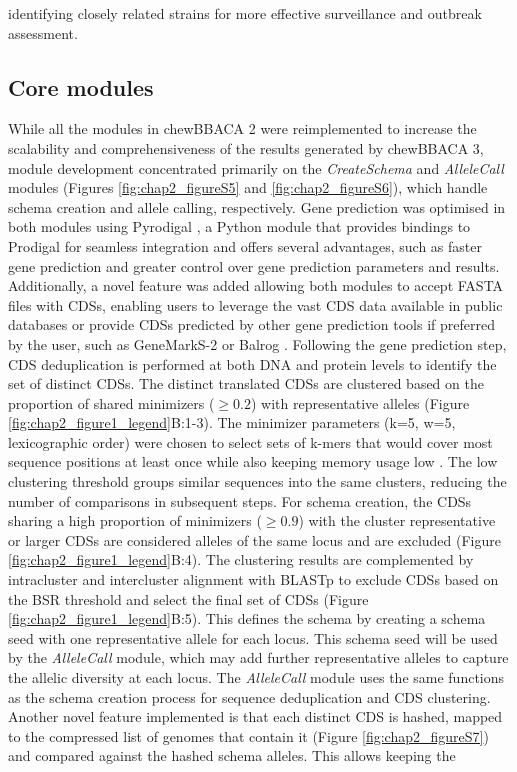 identifying closely related strains for more effective surveillance and outbreak assessment.

\subsection{Core modules} \label{ssec:ch2_implementation_core_modules}

While all the modules in chewBBACA 2 were reimplemented to increase the scalability and comprehensiveness of the results generated by chewBBACA 3, module development concentrated primarily on the \textit{CreateSchema} and \textit{AlleleCall} modules (Figures \ref{fig:chap2_figureS5} and \ref{fig:chap2_figureS6}), which handle schema creation and allele calling, respectively. Gene prediction was optimised in both modules using Pyrodigal \citep{larralde_pyrodigal_2022, hyatt_prodigal_2010}, a Python module that provides bindings to Prodigal for seamless integration and offers several advantages, such as faster gene prediction and greater control over gene prediction parameters and results. Additionally, a novel feature was added allowing both modules to accept FASTA files with \ac{CDSs}, enabling users to leverage the vast \ac{CDS} data available in public databases or provide \ac{CDSs} predicted by other gene prediction tools if preferred by the user, such as GeneMarkS-2 or Balrog \citep{lomsadze_modeling_2018, sommer_balrog_2021}. Following the gene prediction step, \ac{CDS} deduplication is performed at both \ac{DNA} and protein levels to identify the set of distinct \ac{CDSs}. The distinct translated \ac{CDSs} are clustered based on the proportion of shared minimizers ($\geq0.2$) with representative alleles \citep{schleimer_winnowing_nodate, roberts_reducing_2004, marcais_improving_2017} (Figure \ref{fig:chap2_figure1_legend}B:1-3). The minimizer parameters (k=5, w=5, lexicographic order) were chosen to select sets of k-mers that would cover most sequence positions at least once while also keeping memory usage low \citep{zheng_improved_2020}. The low clustering threshold groups similar sequences into the same clusters, reducing the number of comparisons in subsequent steps. For schema creation, the \ac{CDSs} sharing a high proportion of minimizers ($\geq0.9$) with the cluster representative or larger \ac{CDSs} are considered alleles of the same locus and are excluded (Figure \ref{fig:chap2_figure1_legend}B:4). The clustering results are complemented by intracluster and intercluster alignment with \ac{BLASTp} to exclude \ac{CDSs} based on the \ac{BSR} threshold and select the final set of \ac{CDSs} (Figure \ref{fig:chap2_figure1_legend}B:5). This defines the schema by creating a schema seed with one representative allele for each locus. This schema seed will be used by the \textit{AlleleCall} module, which may add further representative alleles to capture the allelic diversity at each locus. The \textit{AlleleCall} module uses the same functions as the schema creation process for sequence deduplication and \ac{CDS} clustering. Another novel feature implemented is that each distinct \ac{CDS} is hashed, mapped to the compressed list of genomes that contain it (Figure \ref{fig:chap2_figureS7}) and compared against the hashed schema alleles. This allows keeping the 